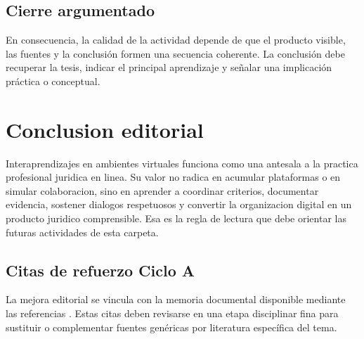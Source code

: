 \documentclass[
  spanish,
  letterpaper, oneside
]{article}
\begin{document}
\subsection*{Cierre argumentado}
En consecuencia, la calidad de la actividad depende de que el producto visible, las fuentes y la conclusión formen una secuencia coherente. La conclusión debe recuperar la tesis, indicar el principal aprendizaje y señalar una implicación práctica o conceptual.


\section{Conclusion editorial}

Interaprendizajes en ambientes virtuales funciona como una antesala a la practica
profesional juridica en linea. Su valor no radica en acumular plataformas o en
simular colaboracion, sino en aprender a coordinar criterios, documentar
evidencia, sostener dialogos respetuosos y convertir la organizacion digital en
un producto juridico comprensible. Esa es la regla de lectura que debe orientar
las futuras actividades de esta carpeta.

\clearpage
\nocite{unadmSitioWeb,unadmMallaDerecho2024,santanaBienvenidaInteraprendizaje2026,introduccionInteraprendizajeVirtualDerecho2026}



\subsection*{Citas de refuerzo Ciclo A}
La mejora editorial se vincula con la memoria documental disponible mediante las referencias \citep{unadmSitioWeb,unadmMallaDerecho2024,santanaBienvenidaInteraprendizaje2026}. Estas citas deben revisarse en una etapa disciplinar fina para sustituir o complementar fuentes genéricas por literatura específica del tema.
\end{document}
